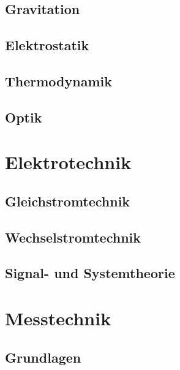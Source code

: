 \documentclass[a5paper]{report}
\begin{document}
		\chapter{Gravitation}
		

		\chapter{Elektrostatik}
		

		\chapter{Thermodynamik}
		

		\chapter{Optik}
		

	\part{Elektrotechnik}

		\chapter{Gleichstromtechnik}
		

		\chapter{Wechselstromtechnik}
		

		\chapter{Signal- und Systemtheorie}
		
		
	\part{Messtechnik}
	
		\chapter{Grundlagen}
		

%
%
\end{document}
